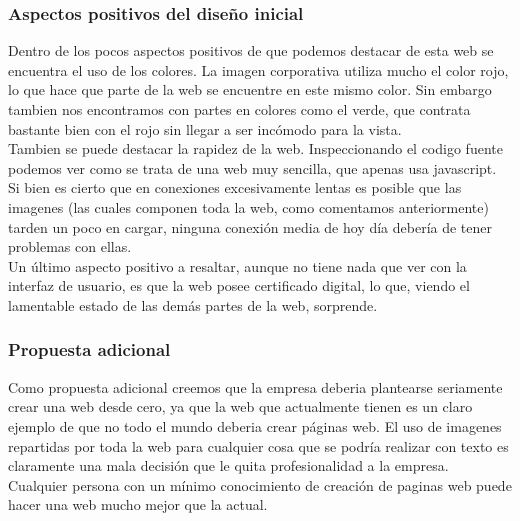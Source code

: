 \documentclass[a4paper,11pt]{article}
\begin{document}
\subsubsection{Aspectos positivos del diseño inicial}
Dentro de los pocos aspectos positivos de que podemos destacar de esta web se encuentra el uso de los colores. La imagen corporativa utiliza mucho el color rojo, lo que hace que parte de la web se encuentre en este mismo color. Sin embargo tambien nos encontramos con partes en colores como el verde, que contrata bastante bien con el rojo sin llegar a ser incómodo para la vista.\\
Tambien se puede destacar la rapidez de la web. Inspeccionando el codigo fuente podemos ver como se trata de una web muy sencilla, que apenas usa javascript. Si bien es cierto que en conexiones excesivamente lentas es posible que las imagenes (las cuales componen toda la web, como comentamos anteriormente) tarden un poco en cargar, ninguna conexión media de hoy día debería de tener problemas con ellas.\\
Un último aspecto positivo a resaltar, aunque no tiene nada que ver con la interfaz de usuario, es que la web posee certificado digital, lo que, viendo el lamentable estado de las demás partes de la web, sorprende.


\subsubsection{Propuesta adicional}
Como propuesta adicional creemos que la empresa deberia plantearse seriamente crear una web desde cero, ya que la web que actualmente tienen es un claro ejemplo de que no todo el mundo deberia crear páginas web. El uso de imagenes repartidas por toda la web para cualquier cosa que se podría realizar con texto es claramente una mala decisión que le quita profesionalidad a la empresa.\\
Cualquier persona con un mínimo conocimiento de creación de paginas web puede hacer una web mucho mejor que la actual.
\end{document}

